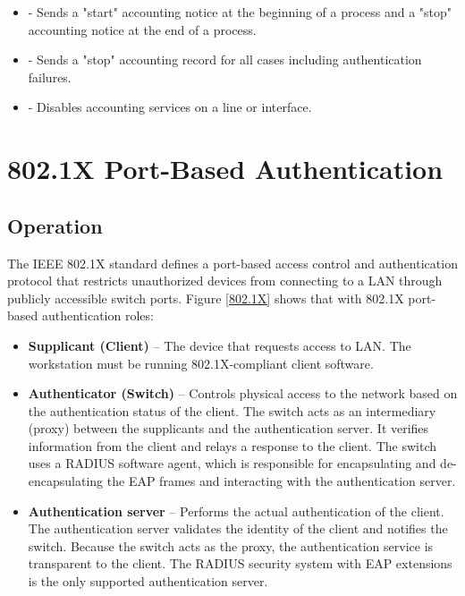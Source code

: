 \begin{itemize}
\item {} - Sends a "start" accounting notice at the beginning of a process and a "stop" accounting notice at the end of a process.
\item {} - Sends a "stop" accounting record for all cases including authentication failures.
\item {} - Disables accounting services on a line or interface.
\end{itemize}
    

\section{802.1X Port-Based Authentication}

\subsection{Operation}

The IEEE 802.1X standard defines a port-based access control and authentication protocol that restricts unauthorized devices from connecting to a LAN through publicly accessible switch ports. Figure \ref{802.1X} shows that with 802.1X port-based authentication roles:

\begin{itemize}
\item \textbf{Supplicant (Client)} -- The device that requests access to LAN. The workstation must be running 802.1X-compliant client software. 
\item \textbf{Authenticator (Switch)} -- Controls physical access to the network based on the authentication status of the client. The switch acts as an intermediary (proxy) between the supplicants and the authentication server. It verifies information from the client and relays a response to the client. The switch uses a RADIUS software agent, which is responsible for encapsulating and de-encapsulating the EAP frames and interacting with the authentication server.
\item \textbf{Authentication server} -- Performs the actual authentication of the client. The authentication server validates the identity of the client and notifies the switch. Because the switch acts as the proxy, the authentication service is transparent to the client. The RADIUS security system with EAP extensions is the only supported authentication server.
\end{itemize}

